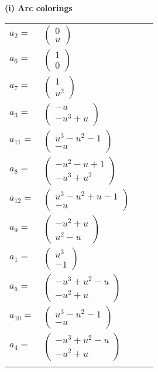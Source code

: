 \documentclass[1p]{elsarticle_modified}
\theoremstyle{definition}
\begin{document}
\flushleft \textbf{(i) Arc colorings}\\
\begin{tabular}{m{7pt} m{180pt} m{7pt} m{180pt} }
\flushright $a_{2}=$&$\begin{pmatrix}0\\u\end{pmatrix}$ \\
\flushright $a_{6}=$&$\begin{pmatrix}1\\0\end{pmatrix}$ \\
\flushright $a_{7}=$&$\begin{pmatrix}1\\u^2\end{pmatrix}$ \\
\flushright $a_{3}=$&$\begin{pmatrix}- u\\- u^3+u\end{pmatrix}$ \\
\flushright $a_{11}=$&$\begin{pmatrix}u^3- u^2-1\\- u\end{pmatrix}$ \\
\flushright $a_{8}=$&$\begin{pmatrix}- u^2- u+1\\- u^3+u^2\end{pmatrix}$ \\
\flushright $a_{12}=$&$\begin{pmatrix}u^3- u^2+u-1\\- u\end{pmatrix}$ \\
\flushright $a_{9}=$&$\begin{pmatrix}- u^2+u\\u^2- u\end{pmatrix}$ \\
\flushright $a_{1}=$&$\begin{pmatrix}u^3\\-1\end{pmatrix}$ \\
\flushright $a_{5}=$&$\begin{pmatrix}- u^3+u^2- u\\- u^2+u\end{pmatrix}$ \\
\flushright $a_{10}=$&$\begin{pmatrix}u^3- u^2-1\\- u\end{pmatrix}$ \\
\flushright $a_{4}=$&$\begin{pmatrix}- u^3+u^2- u\\- u^2+u\end{pmatrix}$\\&\end{tabular}
\end{document}
